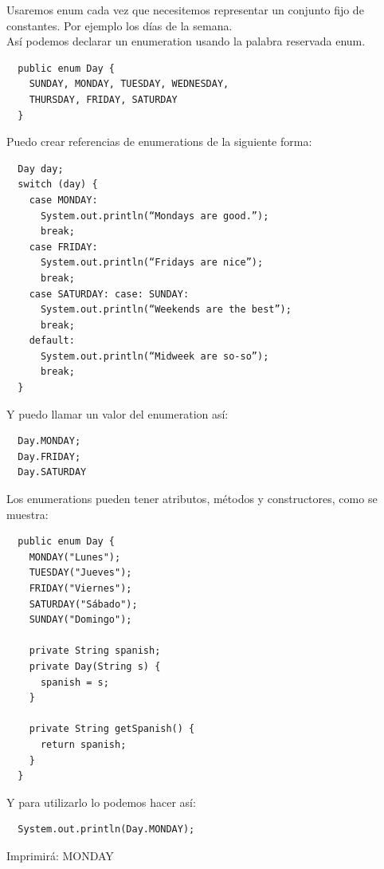 \documentclass{article}
\begin{document}
Usaremos enum cada vez que necesitemos representar un conjunto fijo de
constantes. Por ejemplo los días de la semana.\\

Así podemos declarar un enumeration usando la palabra reservada enum.\\

\begin{verbatim}
  public enum Day {
    SUNDAY, MONDAY, TUESDAY, WEDNESDAY,
    THURSDAY, FRIDAY, SATURDAY
  }
\end{verbatim}

Puedo crear referencias de enumerations de la siguiente forma:\\

\begin{verbatim}
  Day day;
  switch (day) {
    case MONDAY:
      System.out.println(“Mondays are good.”);
      break;
    case FRIDAY:
      System.out.println(“Fridays are nice”);
      break;
    case SATURDAY: case: SUNDAY:
      System.out.println(“Weekends are the best”);
      break;
    default:
      System.out.println(“Midweek are so-so”);
      break;
  }
\end{verbatim}

Y puedo llamar un valor del enumeration así:\\

\begin{verbatim}
  Day.MONDAY;
  Day.FRIDAY;
  Day.SATURDAY
\end{verbatim}

Los enumerations pueden tener atributos, métodos y constructores, como se
muestra:\\

\begin{verbatim}
  public enum Day {
    MONDAY("Lunes");
    TUESDAY("Jueves");
    FRIDAY("Viernes");
    SATURDAY("Sábado");
    SUNDAY("Domingo");

    private String spanish;
    private Day(String s) {
      spanish = s;
    }

    private String getSpanish() {
      return spanish;
    }
  }
\end{verbatim}

Y para utilizarlo lo podemos hacer así:\\

\begin{verbatim}
  System.out.println(Day.MONDAY);
\end{verbatim}

Imprimirá: MONDAY\\
\end{document}
